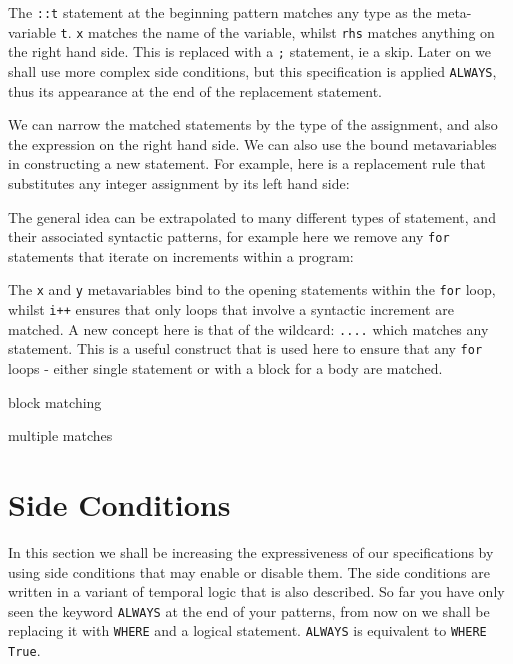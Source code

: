 \documentclass[final,twoside,12pt]{article}
\begin{document}


The {\tt ::t} statement at the beginning pattern matches any type as the meta-variable {\tt t}.
{\tt x} matches the name of the variable, whilst {\tt rhs} matches anything on the right hand side.
This is replaced with a {\tt ;} statement, ie a skip.  Later on we shall use more complex side conditions,
but this specification is applied {\tt ALWAYS}, thus its appearance at the end of the replacement statement.

We can narrow the matched statements by the type of the assignment, and also the expression on the right hand side.
We can also use the bound metavariables in constructing a new statement.  For example, here is a replacement rule
that substitutes any integer assignment by its left hand side:



The general idea can be extrapolated to many different types of statement, and their associated syntactic patterns,
for example here we remove any {\tt for} statements that iterate on increments within a program:



The {\tt x} and {\tt y} metavariables bind to the opening statements within the {\tt for} loop, whilst
{\tt i++} ensures that only loops that involve a syntactic increment are matched.  A new concept here
is that of the wildcard: {\tt ....} which matches any statement.  This is a useful construct that is
used here to ensure that any {\tt for} loops - either single statement or with a block for a body are matched.

block matching

multiple matches

\section{Side Conditions}
\label{sec:side-conditions}

In this section we shall be increasing the expressiveness of our specifications by using side conditions
that may enable or disable them.  The side conditions are written in a variant of temporal logic that is
also described.  So far you have only seen the keyword {\tt ALWAYS} at the end of your patterns, from now
on we shall be replacing it with {\tt WHERE} and a logical statement.  {\tt ALWAYS} is equivalent to
{\tt WHERE True}.
\end{document}
